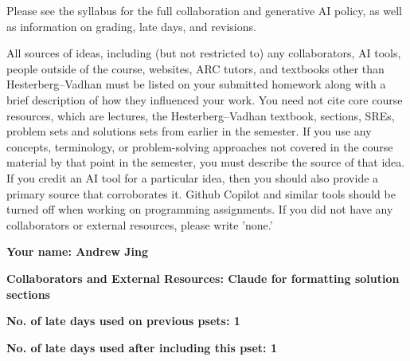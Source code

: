 \documentclass[11pt]{article}
\begin{document}

Please see the syllabus for the full collaboration and generative AI policy, as well as information on grading, late days, and revisions.

All sources of ideas, including (but not restricted to) any collaborators, AI tools, people outside of the course, websites, ARC tutors, and textbooks other than Hesterberg--Vadhan must be listed on your submitted homework along with a brief description of how they influenced your work. You need not cite core course resources, which are lectures, the Hesterberg--Vadhan textbook, sections, SREs, problem sets and solutions sets from earlier in the semester. If you use any concepts, terminology, or problem-solving approaches not covered in the course material by that point in the semester, you must describe the source of that idea. If you credit an AI tool for a particular idea, then you should also provide a primary source that corroborates it. Github Copilot and similar tools should be turned off when working on programming assignments. If you did not have any collaborators or external resources, please write 'none.'

\vspace{1em}

\textbf{Your name: Andrew Jing}

\textbf{Collaborators and External Resources: Claude for formatting solution sections}

\textbf{No. of late days used on previous psets: 1}

\textbf{No. of late days used after including this pset: 1}
\end{document}
